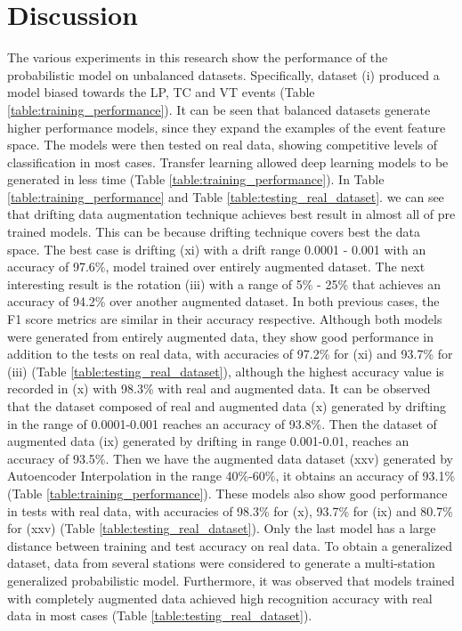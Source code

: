 \documentclass[journal]{IEEEtran}
\begin{document}
\section{Discussion}
The various experiments in this research show the performance of the probabilistic model on unbalanced datasets. Specifically, dataset (i) produced a model biased towards the LP, TC and VT events (Table \ref{table:training_performance}).
It can be seen that balanced datasets generate higher performance models, since they expand the examples of the event feature space. The models were then tested on real data, showing competitive levels of classification in most cases. Transfer learning allowed deep learning models to be generated in less time (Table \ref{table:training_performance}).
In Table \ref{table:training_performance} and Table \ref{table:testing_real_dataset}. we can see that drifting data augmentation technique achieves best result in almost all of pre trained models. This can be because drifting technique covers best the data space. The best case is drifting (xi) with a drift range 0.0001 - 0.001 with an accuracy of 97.6\%, model trained over entirely augmented dataset. The next interesting result is the rotation (iii) with a range of 5\% - 25\% that achieves an accuracy of 94.2\% over another augmented dataset. In both previous cases, the F1 score metrics are similar in their accuracy respective. Although both models were generated from entirely augmented data, they show good performance in addition to the tests on real data, with accuracies of 97.2\% for (xi) and 93.7\% for (iii) (Table \ref{table:testing_real_dataset}), although the highest accuracy value is recorded in (x) with 98.3\% with real and augmented data.
It can be observed that the dataset composed of real and augmented data (x) generated by drifting in the range of 0.0001-0.001 reaches an accuracy of 93.8\%. Then the dataset of augmented data (ix) generated by drifting in range 0.001-0.01, reaches an accuracy of 93.5\%. Then we have the augmented data dataset (xxv) generated by Autoencoder Interpolation in the range 40\%-60\%, it obtains an accuracy of 93.1\% (Table \ref{table:training_performance}). These models also show good performance in tests with real data, with accuracies of 98.3\% for (x), 93.7\% for (ix) and 80.7\% for (xxv) (Table \ref{table:testing_real_dataset}). Only the last model has a large distance between training and test accuracy on real data.
To obtain a generalized dataset, data from several stations were considered to generate a multi-station generalized probabilistic model. Furthermore, it was observed that models trained with completely augmented data achieved high recognition accuracy with real data in most cases (Table \ref{table:testing_real_dataset}).
\end{document}
